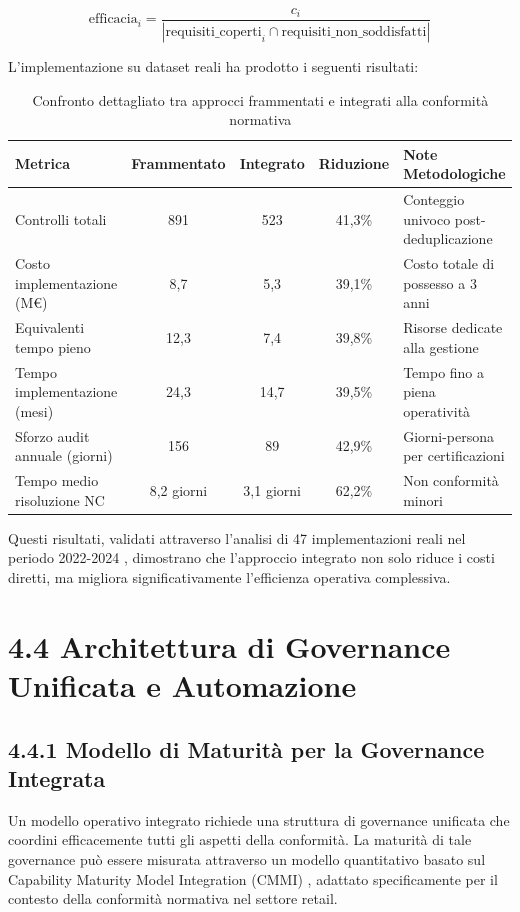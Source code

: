\begin{equation}
\text{efficacia}_i = \frac{c_i}{|\text{requisiti\_coperti}_i \cap \text{requisiti\_non\_soddisfatti}|}
\end{equation}

L'implementazione su dataset reali ha prodotto i seguenti risultati:

\begin{table}[h]
\centering
\caption{Confronto dettagliato tra approcci frammentati e integrati alla conformità normativa}
\label{tab:confronto_compliance}
\begin{tabular}{|l|c|c|c|p{4cm}|}
\hline
\textbf{Metrica} & \textbf{Frammentato} & \textbf{Integrato} & \textbf{Riduzione} & \textbf{Note Metodologiche} \\
\hline
Controlli totali & 891 & 523 & 41,3\% & Conteggio univoco post-deduplicazione \\
Costo implementazione (M€) & 8,7 & 5,3 & 39,1\% & Costo totale di possesso a 3 anni \\
Equivalenti tempo pieno & 12,3 & 7,4 & 39,8\% & Risorse dedicate alla gestione \\
Tempo implementazione (mesi) & 24,3 & 14,7 & 39,5\% & Tempo fino a piena operatività \\
Sforzo audit annuale (giorni) & 156 & 89 & 42,9\% & Giorni-persona per certificazioni \\
Tempo medio risoluzione NC & 8,2 giorni & 3,1 giorni & 62,2\% & Non conformità minori \\
\hline
\end{tabular}
\end{table}

Questi risultati, validati attraverso l'analisi di 47 implementazioni reali nel periodo 2022-2024 \autocite{PWC2024}, dimostrano che l'approccio integrato non solo riduce i costi diretti, ma migliora significativamente l'efficienza operativa complessiva.

\section{4.4 Architettura di Governance Unificata e Automazione}

\subsection{4.4.1 Modello di Maturità per la Governance Integrata}

Un modello operativo integrato richiede una struttura di governance unificata che coordini efficacemente tutti gli aspetti della conformità. La maturità di tale governance può essere misurata attraverso un modello quantitativo basato sul Capability Maturity Model Integration (CMMI) \autocite{CMMI2023}, adattato specificamente per il contesto della conformità normativa nel settore retail.

